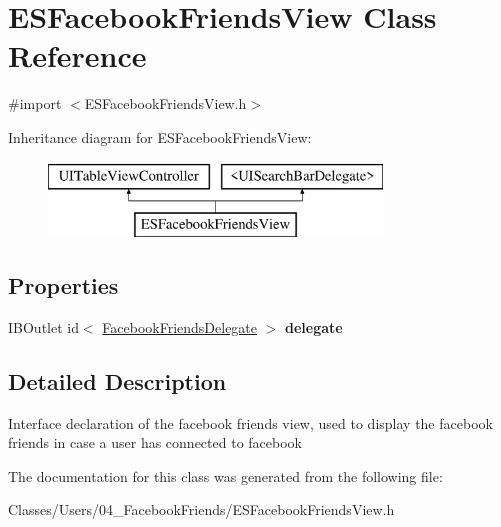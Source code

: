 \hypertarget{interface_e_s_facebook_friends_view}{}\section{E\+S\+Facebook\+Friends\+View Class Reference}
\label{interface_e_s_facebook_friends_view}


{\ttfamily \#import $<$E\+S\+Facebook\+Friends\+View.\+h$>$}

Inheritance diagram for E\+S\+Facebook\+Friends\+View\+:\begin{figure}[H]
\begin{center}
\leavevmode
\includegraphics[height=2.000000cm]{interface_e_s_facebook_friends_view}
\end{center}
\end{figure}
\subsection*{Properties}
\begin{DoxyCompactItemize}
\item 
\hypertarget{interface_e_s_facebook_friends_view_a49c7e1719590bd6c5b1b024ec31caaf4}{}I\+B\+Outlet id$<$ \hyperlink{protocol_facebook_friends_delegate-p}{Facebook\+Friends\+Delegate} $>$ {\bfseries delegate}\label{interface_e_s_facebook_friends_view_a49c7e1719590bd6c5b1b024ec31caaf4}

\end{DoxyCompactItemize}


\subsection{Detailed Description}
Interface declaration of the facebook friends view, used to display the facebook friends in case a user has connected to facebook 

The documentation for this class was generated from the following file\+:\begin{DoxyCompactItemize}
\item 
Classes/\+Users/04\+\_\+\+Facebook\+Friends/E\+S\+Facebook\+Friends\+View.\+h\end{DoxyCompactItemize}
